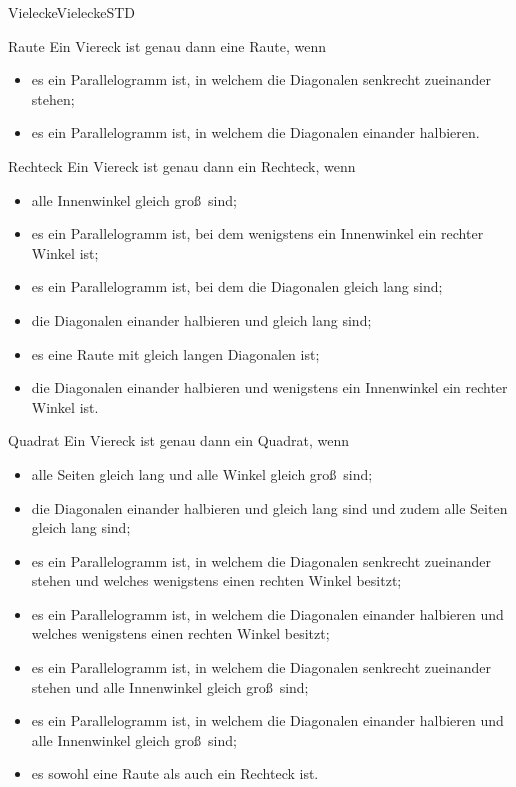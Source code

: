 \begin{MXContent}{Vielecke}{Vielecke}{STD}
\begin{MXInfo}{Raute}%
Ein Viereck ist genau dann eine Raute, wenn
\begin{itemize}
 \item es ein Parallelogramm ist, in welchem die Diagonalen senkrecht zueinander stehen;
 \item es ein Parallelogramm ist, in welchem die Diagonalen einander halbieren.
\end{itemize}
\end{MXInfo}


\begin{MXInfo}{Rechteck}%
Ein Viereck ist genau dann ein Rechteck, wenn
\begin{itemize}
 \item alle Innenwinkel gleich gro\ss\ sind;
\item es ein Parallelogramm ist, bei dem wenigstens ein Innenwinkel ein rechter Winkel ist;
\item es ein Parallelogramm ist, bei dem die Diagonalen gleich lang sind; 
\item die Diagonalen einander halbieren und gleich lang sind;
\item es eine Raute mit gleich langen Diagonalen ist;
\item die Diagonalen einander halbieren und wenigstens ein Innenwinkel ein rechter Winkel ist.
\end{itemize}
\end{MXInfo}


\begin{MXInfo}{Quadrat}%
Ein Viereck ist genau dann ein Quadrat, wenn
\begin{itemize}
\item alle Seiten gleich lang und alle Winkel gleich gro\ss\ sind;
 \item die Diagonalen einander halbieren und gleich lang sind und zudem alle Seiten gleich lang sind;
 \item es ein Parallelogramm ist, in welchem die Diagonalen senkrecht zueinander stehen und welches wenigstens einen rechten Winkel besitzt;
 \item es ein Parallelogramm ist, in welchem die Diagonalen einander halbieren und welches wenigstens einen rechten Winkel besitzt;
 \item es ein Parallelogramm ist, in welchem die Diagonalen senkrecht zueinander stehen und alle Innenwinkel gleich gro\ss\ sind;
 \item es ein Parallelogramm ist, in welchem die Diagonalen einander halbieren und alle Innenwinkel gleich gro\ss\ sind;
\item es sowohl eine Raute als auch ein Rechteck ist.
\end{itemize}
\end{MXInfo}



\end{MXContent}
